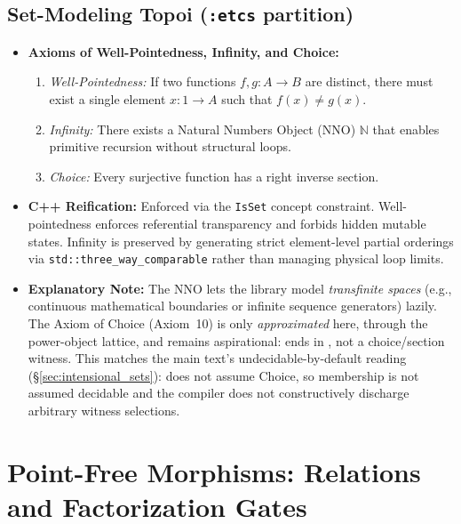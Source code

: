 \documentclass[11pt, a4paper]{article}
\begin{document}
\subsection{Set-Modeling Topoi (\texttt{:etcs} partition)}
\begin{itemize}
    \item \textbf{Axioms of Well-Pointedness, Infinity, and Choice:}
    \begin{enumerate}
        \item \textit{Well-Pointedness:} If two functions $f, g: A \to B$ are distinct, there must exist a single element $x: 1 \to A$ such that $f(x) \neq g(x)$.
        \item \textit{Infinity:} There exists a Natural Numbers Object (NNO) $\mathbb{N}$ that enables primitive recursion without structural loops.
        \item \textit{Choice:} Every surjective function has a right inverse section.
    \end{enumerate}
    \item \textbf{C++ Reification:} Enforced via the \texttt{IsSet} concept constraint. Well-pointedness enforces referential transparency and forbids hidden mutable states. Infinity is preserved by generating strict element-level partial orderings via \texttt{std::three\_way\_comparable} rather than managing physical loop limits.
    \item \textbf{Explanatory Note:} The NNO lets the library model \textit{transfinite spaces} (e.g., continuous mathematical boundaries or infinite sequence generators) lazily. The Axiom of Choice (Axiom~10) is only \emph{approximated} here, through the power-object lattice, and remains aspirational:  ends in , not a choice/section witness. This matches the main text's undecidable-by-default reading (§\ref{sec:intensional_sets}):  does not assume Choice, so membership is not assumed decidable and the compiler does not constructively discharge arbitrary witness selections.
\end{itemize}

\clearpage
\section{Point-Free Morphisms: Relations and Factorization Gates}
\label{sec:morphisms-appendix}

\end{document}
